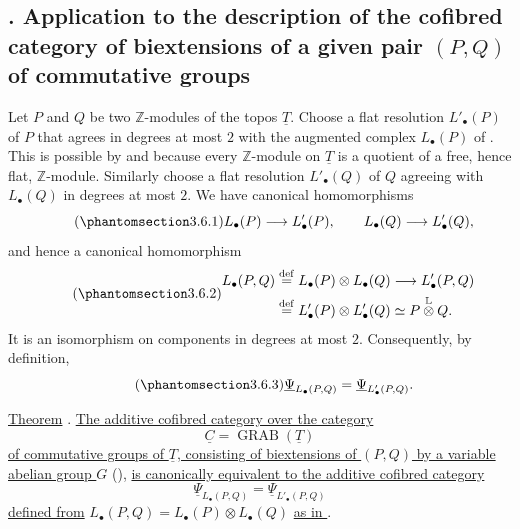
\subsection*{. Application to the description of the cofibred
category of biextensions of a given pair $(P,Q)$ of commutative
groups}

Let $P$ and $Q$ be two $\mathbb Z$-modules of the topos
$\underline T$.  Choose a flat resolution $L'_\bullet(P)$ of $P$
that agrees in degrees at most $2$ with the augmented complex
$L_\bullet(P)$ of .  This is possible by  and because every
$\mathbb Z$-module on $\underline T$ is a quotient of a free, hence
flat, $\mathbb Z$-module.  Similarly choose a flat resolution
$L'_\bullet(Q)$ of $Q$ agreeing with $L_\bullet(Q)$ in degrees at
most $2$.  We have canonical homomorphisms
\begin{equation}\tag{\SGARefTarget{sga7.sga7i.evii.n3-6-1}{3.6.1}}
 L_\bullet(P)\longrightarrow L'_\bullet(P),
 \qquad
 L_\bullet(Q)\longrightarrow L'_\bullet(Q),
\end{equation}
and hence a canonical homomorphism
\begin{equation}\tag{\SGARefTarget{sga7.sga7i.evii.n3-6-2}{3.6.2}}
\begin{split}
 L_\bullet(P,Q)
 &\overset{\mathrm{def}}{=}L_\bullet(P)\otimes L_\bullet(Q)
 \longrightarrow L'_\bullet(P,Q)\\
 &\overset{\mathrm{def}}{=}L'_\bullet(P)\otimes L'_\bullet(Q)
 \simeq P\mathbin{\overset{\mathbb L}{\otimes}}Q.
\end{split}
\end{equation}
It is an isomorphism on components in degrees at most $2$.
Consequently, by definition,
\begin{equation}\tag{\SGARefTarget{sga7.sga7i.evii.n3-6-3}{3.6.3}}
 \underline\Psi_{L_\bullet(P,Q)}
 =
 \underline\Psi_{L'_\bullet(P,Q)}.
\end{equation}

\underline{Theorem} . \underline{The additive cofibred category
over the category}
\[
 \underline C=\operatorname{GRAB}(\underline T)
\]
\underline{of commutative groups of $\underline T$, consisting of
biextensions of $(P,Q)$ by a variable abelian group $G$} (),
\underline{is canonically equivalent to the additive cofibred
category}
\[
 \underline\Psi_{L_\bullet(P,Q)}
 =
 \underline\Psi_{L'_\bullet(P,Q)}
\]
\underline{defined from}
$L_\bullet(P,Q)=L_\bullet(P)\otimes L_\bullet(Q)$
\underline{as in }.

